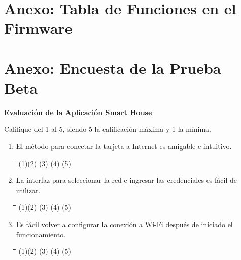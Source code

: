 \begin{appendix}
\chapter{Anexo: Tabla de Funciones en el Firmware}\label{AnexoA}



\chapter{Anexo: Encuesta de la Prueba Beta}\label{AnexoB}

\textbf{Evaluación de la Aplicación Smart House\\}

Califique del 1 al 5, siendo 5 la calificación máxima y 1 la mínima.\\

\begin{enumerate}
	\item El método para conectar la tarjeta a Internet es amigable e intuitivo.
		
\begin{tabbing}
	\hspace{2cm}\=\hspace{2cm}\=\hspace{2cm}\=\hspace{2cm}\=\kill
	(1)\>(2)  \>(3)  \>(4)  \>(5) 
\end{tabbing} 
		
	\item La interfaz para seleccionar la red e ingresar las credenciales es fácil de utilizar. 
	
	\begin{tabbing}
		\hspace{2cm}\=\hspace{2cm}\=\hspace{2cm}\=\hspace{2cm}\=\kill
		(1)\>(2)  \>(3)  \>(4)  \>(5) 
	\end{tabbing} 

	\item Es fácil volver a configurar la conexión a Wi-Fi después de iniciado el funcionamiento.
	
	\begin{tabbing}
		\hspace{2cm}\=\hspace{2cm}\=\hspace{2cm}\=\hspace{2cm}\=\kill
		(1)\>(2)  \>(3)  \>(4)  \>(5) 
	\end{tabbing} 


\end{enumerate}
\end{appendix}
